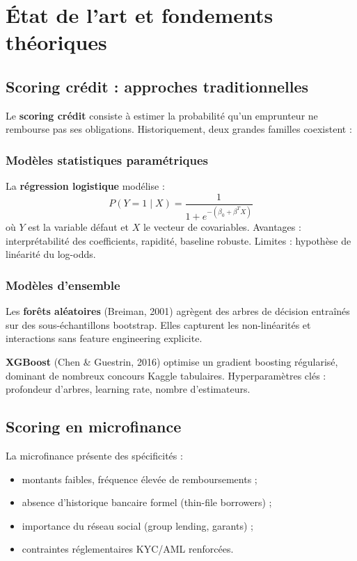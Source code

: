 \chapter{État de l'art et fondements théoriques}
\label{ch:etatart}

\section{Scoring crédit : approches traditionnelles}

Le \textbf{scoring crédit} consiste à estimer la probabilité qu'un emprunteur ne rembourse pas ses obligations. Historiquement, deux grandes familles coexistent :

\subsection{Modèles statistiques paramétriques}

La \textbf{régression logistique} modélise :
\[
P(Y=1 \mid X) = \frac{1}{1 + e^{-(\beta_0 + \beta^T X)}}
\]
où $Y$ est la variable défaut et $X$ le vecteur de covariables. Avantages : interprétabilité des coefficients, rapidité, baseline robuste. Limites : hypothèse de linéarité du log-odds.

\subsection{Modèles d'ensemble}

Les \textbf{forêts aléatoires} (Breiman, 2001) agrègent des arbres de décision entraînés sur des sous-échantillons bootstrap. Elles capturent les non-linéarités et interactions sans feature engineering explicite.

\textbf{XGBoost} (Chen \& Guestrin, 2016) optimise un gradient boosting régularisé, dominant de nombreux concours Kaggle tabulaires. Hyperparamètres clés : profondeur d'arbres, learning rate, nombre d'estimateurs.

\section{Scoring en microfinance}

La microfinance présente des spécificités :
\begin{itemize}[leftmargin=*]
  \item montants faibles, fréquence élevée de remboursements ;
  \item absence d'historique bancaire formel (thin-file borrowers) ;
  \item importance du réseau social (group lending, garants) ;
  \item contraintes réglementaires KYC/AML renforcées.
\end{itemize}

